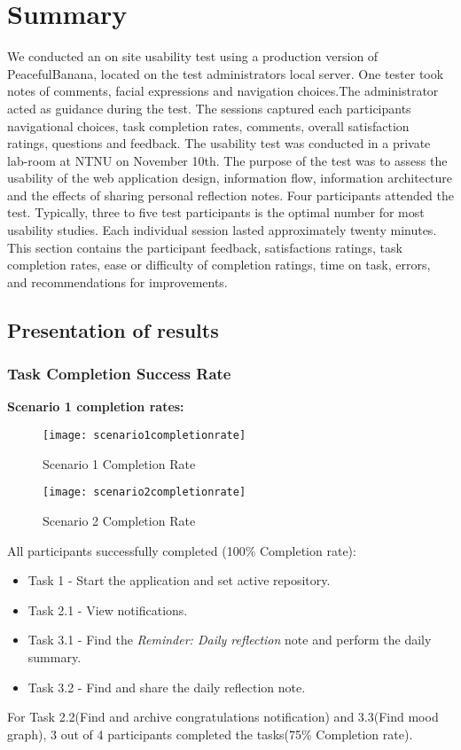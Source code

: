 \section{Summary}
We conducted an on site usability test using a production version of PeacefulBanana, located on the test administrators local server. One tester took notes of comments, facial expressions and navigation choices.The administrator acted as guidance during the test. The sessions captured each participants navigational choices, task completion rates, comments, overall satisfaction ratings, questions and feedback.
The usability test was conducted in a private lab-room at NTNU on November 10th. The purpose of the test was to assess the usability of the web application design, information flow, information architecture and the effects of sharing personal reflection notes.
Four participants attended the test. Typically, three to five test participants is the optimal number for most usability studies\citep{nielsen1993mathematical}. Each individual session lasted approximately twenty minutes.
This section contains the participant feedback, satisfactions ratings, task completion rates, ease or difficulty of completion ratings, time on task, errors, and recommendations for improvements.
\subsection{Presentation of results}
\subsubsection{Task Completion Success Rate}
\textbf{Scenario 1 completion rates:}
\begin{figure}[h!]
    \centering
        \texttt{[image: scenario1completionrate]}
    \caption{Scenario 1 Completion Rate}
    \label{scenario1completionrate}
\end{figure}
\begin{figure}[h!]
    \centering
        \texttt{[image: scenario2completionrate]}
    \caption{Scenario 2 Completion Rate}
    \label{scenario2completionrate}
\end{figure}
All participants successfully completed (100\% Completion rate):
\begin{itemize}
	\item Task 1 - Start the application and set active repository. 
	\item Task 2.1 - View notifications. 
	\item Task 3.1 - Find the \emph{Reminder: Daily reflection} note and perform the daily summary. 
	\item Task 3.2 - Find and share the daily reflection note.
\end{itemize}
For Task 2.2(Find and archive congratulations notification) and 3.3(Find mood graph), 3 out of 4 participants completed the tasks(75\% Completion rate). \\

